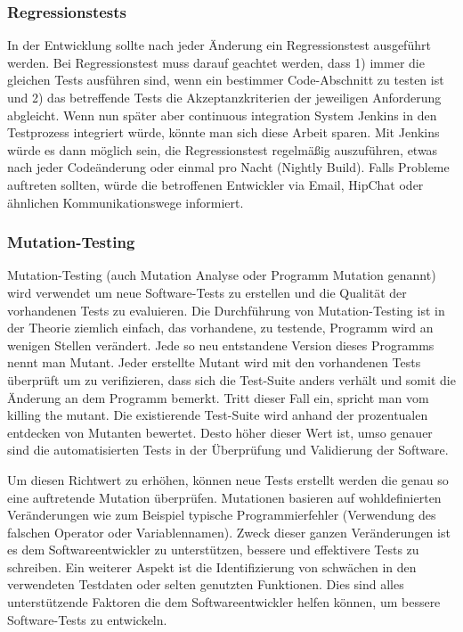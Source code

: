 \subsubsection{Regressionstests}
In der Entwicklung sollte nach jeder Änderung ein Regressionstest ausgeführt werden. Bei Regressionstest muss darauf geachtet werden, dass 1) immer die gleichen Tests ausführen sind, wenn ein bestimmer Code-Abschnitt zu testen ist und 2) das betreffende Tests die Akzeptanzkriterien der jeweiligen Anforderung abgleicht. Wenn nun später aber continuous integration System Jenkins in den Testprozess integriert würde, könnte man sich diese Arbeit sparen. Mit Jenkins würde es dann möglich sein, die Regressionstest regelmäßig auszuführen, etwas nach jeder Codeänderung oder einmal pro Nacht (Nightly Build). Falls Probleme auftreten sollten, würde die betroffenen Entwickler via Email, HipChat oder ähnlichen Kommunikationswege informiert.

\subsubsection{Mutation-Testing}\label{mutation-testing}

Mutation-Testing (auch Mutation Analyse oder Programm Mutation genannt) wird verwendet um neue Software-Tests zu erstellen und die Qualität der vorhandenen Tests zu evaluieren. Die Durchführung von Mutation-Testing ist in der Theorie ziemlich einfach, das vorhandene, zu testende, Programm wird an wenigen Stellen verändert. Jede so neu entstandene Version dieses Programms nennt man Mutant. Jeder erstellte Mutant wird mit den vorhandenen Tests überprüft um zu verifizieren, dass sich die Test-Suite anders verhält und somit die Änderung an dem Programm bemerkt. Tritt dieser Fall ein, spricht man vom \dq{}killing the mutant\dq{}. Die existierende Test-Suite wird anhand der prozentualen entdecken von Mutanten bewertet. Desto höher dieser Wert ist, umso genauer sind die automatisierten Tests in der Überprüfung und Validierung der Software. 

Um diesen Richtwert zu erhöhen, können neue Tests erstellt werden die genau so eine auftretende Mutation überprüfen. Mutationen basieren auf wohldefinierten Veränderungen wie zum Beispiel typische Programmierfehler (Verwendung des falschen Operator oder Variablennamen). Zweck dieser ganzen Veränderungen ist es dem Softwareentwickler zu unterstützen, bessere und effektivere Tests zu schreiben. Ein weiterer Aspekt ist die Identifizierung von schwächen in den verwendeten Testdaten oder selten genutzten Funktionen. Dies sind alles unterstützende Faktoren die dem Softwareentwickler helfen können, um bessere Software-Tests zu entwickeln.

